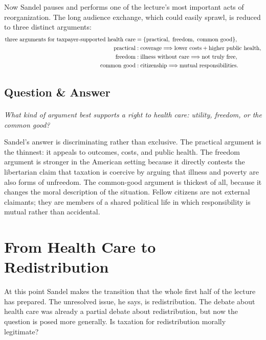 Now Sandel pauses and performs one of the lecture's most important acts of reorganization. The long audience exchange, which could easily sprawl, is reduced to three distinct arguments:
\begin{align}
\text{three arguments for taxpayer-supported health care}
&=
\{\text{practical},\ \text{freedom},\ \text{common good}\}, \notag\\
\text{practical}
&:
\text{coverage}
\Longrightarrow
\text{lower costs} + \text{higher public health}, \notag\\
\text{freedom}
&:
\text{illness without care}
\Longrightarrow
\text{not truly free}, \notag\\
\text{common good}
&:
\text{citizenship}
\Longrightarrow
\text{mutual responsibilities}. \notag
\end{align}

\subsection{Question \& Answer}

\paragraph{}
\emph{What kind of argument best supports a right to health care: utility, freedom, or the common good?}

Sandel's answer is discriminating rather than exclusive. The practical argument is the thinnest: it appeals to outcomes, costs, and public health. The freedom argument is stronger in the American setting because it directly contests the libertarian claim that taxation is coercive by arguing that illness and poverty are also forms of unfreedom. The common-good argument is thickest of all, because it changes the moral description of the situation. Fellow citizens are not external claimants; they are members of a shared political life in which responsibility is mutual rather than accidental.

\section{From Health Care to Redistribution}

At this point Sandel makes the transition that the whole first half of the lecture has prepared. The unresolved issue, he says, is redistribution. The debate about health care was already a partial debate about redistribution, but now the question is posed more generally. Is taxation for redistribution morally legitimate?

